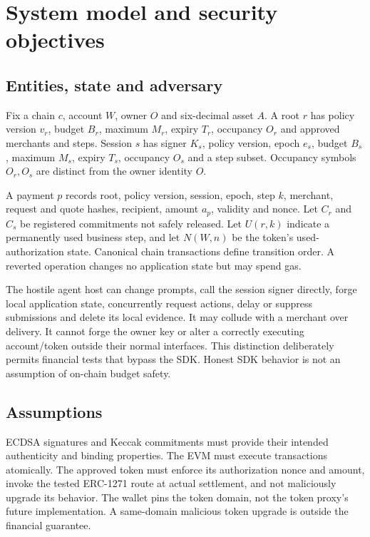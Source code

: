 \section{System model and security objectives}\label{sec:model}
\subsection{Entities, state and adversary}
Fix a chain $c$, account $W$, owner $O$ and six-decimal asset $A$. A root $r$ has policy version $v_r$, budget $B_r$, maximum $M_r$, expiry $T_r$, occupancy $O_r$ and approved merchants and steps. Session $s$ has signer $K_s$, policy version, epoch $e_s$, budget $B_s$, maximum $M_s$, expiry $T_s$, occupancy $O_s$ and a step subset. Occupancy symbols $O_r,O_s$ are distinct from the owner identity $O$.

A payment $p$ records root, policy version, session, epoch, step $k$, merchant, request and quote hashes, recipient, amount $a_p$, validity and nonce. Let $C_r$ and $C_s$ be registered commitments not safely released. Let $U(r,k)$ indicate a permanently used business step, and let $N(W,n)$ be the token's used-authorization state. Canonical chain transactions define transition order. A reverted operation changes no application state but may spend gas.

The hostile agent host can change prompts, call the session signer directly, forge local application state, concurrently request actions, delay or suppress submissions and delete its local evidence. It may collude with a merchant over delivery. It cannot forge the owner key or alter a correctly executing account/token outside their normal interfaces. This distinction deliberately permits financial tests that bypass the SDK. Honest SDK behavior is not an assumption of on-chain budget safety.

\subsection{Assumptions}
ECDSA signatures and Keccak commitments must provide their intended authenticity and binding properties. The EVM must execute transactions atomically. The approved token must enforce its authorization nonce and amount, invoke the tested ERC-1271 route at actual settlement, and not maliciously upgrade its behavior. The wallet pins the token domain, not the token proxy's future implementation. A same-domain malicious token upgrade is outside the financial guarantee.

